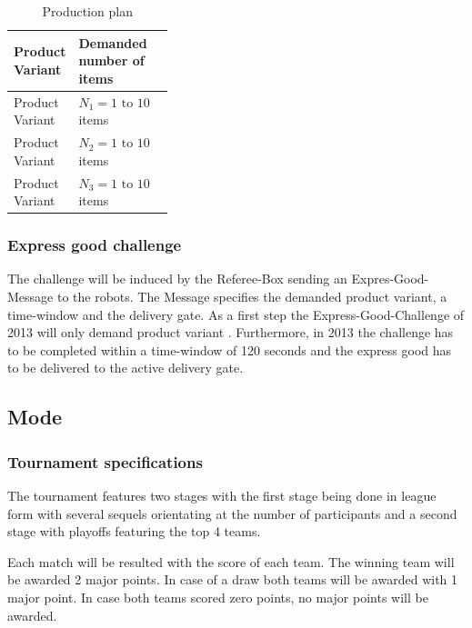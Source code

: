 \documentclass[12pt,twoside]{article}
\begin{document}

\begin{table}[h]
  \centering
  \begin{tabularx}{\linewidth}{p{0.35\linewidth}|X}
    \multicolumn{1}{l}{Product Variant} &\multicolumn{1}{l}{Demanded number of items } \\
    \hline 
    Product Variant \p1 &	$N_1 = 1 \mbox{ to } 10$ items \\
    Product Variant \p2 &	$N_2 = 1 \mbox{ to } 10$ items \\
    Product Variant \p3 &	$N_3 = 1 \mbox{ to } 10$ items \\
	\hline
  \end{tabularx}
  \caption{Production plan}
  \label{tab:production-plan}
\end{table}

\subsubsection{Express good challenge}

The challenge will be induced by the Referee-Box sending an Expres-Good-Message
to the robots. The Message specifies the demanded product variant, a time-window
and the delivery gate. As a first step the Express-Good-Challenge of 2013 will
only demand product variant . Furthermore, in 2013 the challenge has to be
completed within a time-window of 120 seconds and the express good has to be
delivered to the active delivery gate.

\subsection{Mode}
\subsubsection{Tournament specifications}

The tournament features two stages with the first stage being done in
league form with several sequels orientating at the number of
participants and a second stage with playoffs featuring the top 4
teams.

Each match will be resulted with the score of each team. The winning
team will be awarded 2 major points. In case of a draw both teams will
be awarded with 1 major point. In case both teams scored zero points,
no major points will be awarded.
\end{document}

